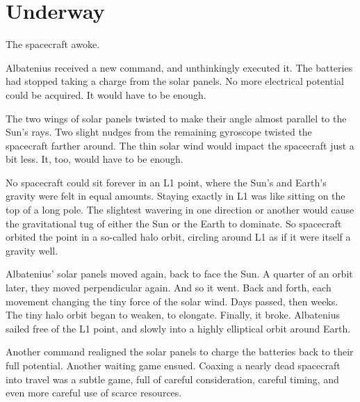 %
%

\chapter{Underway}

The spacecraft awoke.

Albatenius received a new command, and unthinkingly executed it. The batteries had stopped taking a charge from the solar panels. No more electrical potential could be acquired. It would have to be enough.

The two wings of solar panels twisted to make their angle almost parallel to the Sun's rays. Two slight nudges from the remaining gyroscope twisted the spacecraft farther around. The thin solar wind would impact the spacecraft just a bit less. It, too, would have to be enough.

No spacecraft could sit forever in an L1 point, where the Sun's and Earth's gravity were felt in equal amounts. Staying exactly in L1 was like sitting on the top of a long pole. The slightest wavering in one direction or another would cause the gravitational tug of either the Sun or the Earth to dominate. So spacecraft orbited the point in a so-called halo orbit, circling around L1 as if it were itself a gravity well.

Albatenius' solar panels moved again, back to face the Sun. A quarter of an orbit later, they moved perpendicular again. And so it went. Back and forth, each movement changing the tiny force of the solar wind. Days passed, then weeks. The tiny halo orbit began to weaken, to elongate. Finally, it broke. Albatenius sailed free of the L1 point, and slowly into a highly elliptical orbit around Earth.

Another command realigned the solar panels to charge the batteries back to their full potential. Another waiting game ensued. Coaxing a nearly dead spacecraft into travel was a subtle game, full of careful consideration, careful timing, and even more careful use of scarce resources.


\newpage
\thispagestyle{empty}

